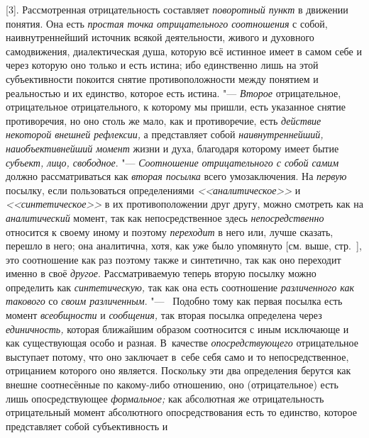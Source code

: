 [3]. Рассмотренная отрицательность составляет {\em поворотный пункт} в
движении понятия. Она есть {\em простая
точка отрицательного соотношения} с собой, наивнутреннейший
источник всякой деятельности, живого и духовного самодвижения,
диалектическая душа, которую всё истинное имеет в самом себе и через
которую оно только и есть истина; ибо единственно лишь на этой
субъективности покоится снятие противоположности между понятием и
реальностью и их единство, которое есть истина. "--- {\em Второе}
отрицательное, отрицательное отрицательного, к которому мы
пришли, есть указанное снятие противоречия, но оно столь же мало, как и
противоречие, есть {\em действие
некоторой внешней рефлексии,} а представляет собой
{\em наивнутреннейший, наиобъективнейший
момент} жизни и духа, благодаря которому имеет бытие
{\em субъект, лицо, свободное}. "--- {\em Соотношение отрицательного с собой
самим} должно рассматриваться как {\em вторая посылка} всего умозаключения. На
{\em первую} посылку, если пользоваться определениями
{\em <<аналитическое>>} и {\em <<синтетическое>>} в
их противоположении друг другу, можно смотреть как на {\em аналитический}
момент, так как непосредственное здесь {\em непосредственно}
относится к своему иному и поэтому {\em переходит} в него
или, лучше сказать, перешло в него; она аналитична, хотя, как уже было
упомянуто [см. выше, стр.~\pageref{bkm:bmpg224a}], это
соотношение как раз поэтому также и синтетично, так как оно переходит
именно в своё {\em другое}. Рассматриваемую теперь вторую
посылку можно определить как {\em синтетическую,} так
как она есть соотношение {\em различенного как такового} со {\em своим
различенным}. "--- ~Подобно тому как первая посылка есть момент
{\em всеобщности} и {\em сообщения,} так
вторая посылка определена через {\em единичность,}
которая ближайшим образом соотносится с иным исключающе и
как существующая особо и разная. В~качестве {\em опосредствующего}
отрицательное выступает потому, что оно заключает в~себе себя
само и то непосредственное, отрицанием которого оно
является. Поскольку эти два определения берутся как внешне соотнесённые по
какому-либо отношению, оно (отрицательное) есть лишь опосредствующее
{\em формальное;} как
абсолютная же отрицательность отрицательный момент абсолютного
опосредствования есть то единство, которое представляет собой субъективность и
